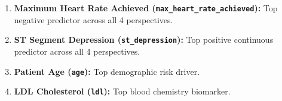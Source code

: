 \begin{tcolorbox}[colback=lightbg,colframe=navyblue,title=\textbf{Consensus Top Predictor Cluster}]
\begin{enumerate}
    \item \textbf{Maximum Heart Rate Achieved (\texttt{max\_heart\_rate\_achieved}):} Top negative predictor across all 4 perspectives.
    \item \textbf{ST Segment Depression (\texttt{st\_depression}):} Top positive continuous predictor across all 4 perspectives.
    \item \textbf{Patient Age (\texttt{age}):} Top demographic risk driver.
    \item \textbf{LDL Cholesterol (\texttt{ldl}):} Top blood chemistry biomarker.
\end{enumerate}
\end{tcolorbox}
